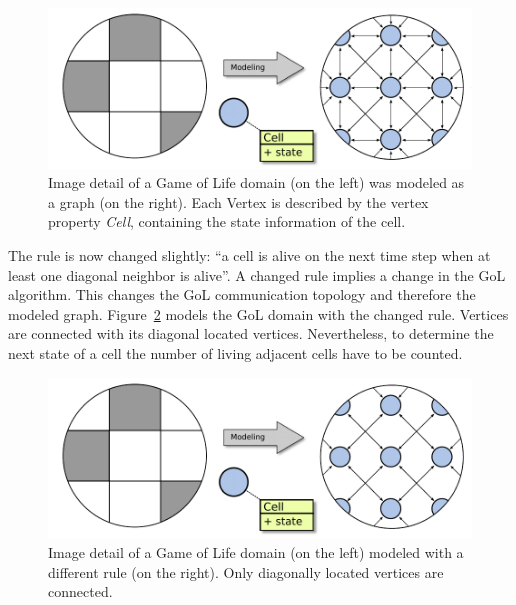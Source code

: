 \begin{figure}[H]
  \centering \includegraphics[width=\textwidth]{graphics/30_gol_modeling}
  \caption{Image detail of a Game of Life domain (on the left) was modeled
    as a graph (on the right). Each Vertex is described by the vertex
    property \emph{Cell}, containing the state information of the cell.}
  \label{fig:gol_modeling}
\end{figure}

\noindent The rule is now changed slightly: ``a cell is alive on the
next time step when at least one diagonal neighbor is alive''.  A
changed rule implies a change in the GoL algorithm.  This changes the
GoL communication topology and therefore the modeled
graph. Figure~\ref{fig:gol_modeling_changed} models the GoL domain
with the changed rule. Vertices are connected with its diagonal
located vertices. Nevertheless, to determine the next state of a cell
the number of living adjacent cells have to be counted.

\begin{figure}[H]
  \centering \includegraphics[width=\textwidth]{graphics/30_gol_modeling_changed}
  \caption{Image detail of a Game of Life domain (on the left)
    modeled with a different rule (on the right). Only diagonally located
    vertices are connected.}
  \label{fig:gol_modeling_changed}
\end{figure}



